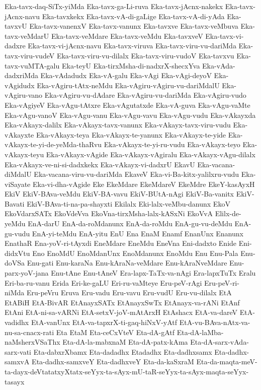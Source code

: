 {Eka-tavx-daq-SiTx-yiMda
Eka-tavx-ga-Li-ruva
Eka-tavx-jAcnx-nakekx
Eka-tavx-jAcnx-navu
Eka-tavxkekx
Eka-tavx-vA-di-gaLige
Eka-tavx-vA-di-yAda
Eka-tavxvU
Eka-tavx-vanenxV
Eka-tavx-vanunx
Eka-tavxve
Eka-tavx-veMbuva
Eka-tavx-veMdarU
Eka-tavx-veMdare
Eka-tavx-veMdu
Eka-tavxveV
Eka-tavx-vi-dadxre
Eka-tavx-vi-jAcnx-navu
Eka-tavx-viruva
Eka-tavx-viru-vu-dariMda
Eka-tavx-viru-vudeV
Eka-tavx-viru-vu-dilalx
Eka-tavx-viru-vudoV
Eka-tavxvu
Eka-tavx-vuMTA-galu
Eka-teyU
Eka-tirxMsha-di-nadxrX-shecxYva
Eka-vAda-dadxriMda
Eka-vAdadudx
Eka-vA-galu
Eka-vAgi
Eka-vAgi-deyoV
Eka-vAgidudx
Eka-vAgiru-tAtx-neMdu
Eka-vAgiru-vAgiru-vu-dariMdalU
Eka-vAgiru-vano
Eka-vAgiru-vu-dAdare
Eka-vAgiru-vu-dariMda
Eka-vAgiru-vudo
Eka-vAgiyeV
Eka-vAgu-tAtxre
Eka-vAgutatxde
Eka-vA-guva
Eka-vAgu-vaMte
Eka-vAgu-vanoV
Eka-vAgu-vanu
Eka-vAgu-vavu
Eka-vAgu-vudu
Eka-vAkayxda
Eka-vAkayx-dalilx
Eka-vAkayx-tavx-vanunx
Eka-vAkayx-tavx-viru-vudu
Eka-vAkayxte
Eka-vAkayx-teya
Eka-vAkayx-te-yanunx
Eka-vAkayx-te-yide
Eka-vAkayx-te-yi-de-yeMda-thaRvu
Eka-vAkayx-te-yi-ru-vudu
Eka-vAkayx-teyo
Eka-vAkayx-teyu
Eka-vAkayx-vAgide
Eka-vAkayx-vAgiralu
Eka-vAkayx-vAgu-dilalx
Eka-vAkayx-ve-ni-si-dadxkekx
Eka-vAkayx-vi-dadxrU
EkavU
Eka-vacana-diMdalU
Eka-vacana-viru-vu-dariMda
EkaveV
Eka-vi-Ba-kitx-yalilxru-vudu
Eka-viSayate
Eka-vi-dha-vAgide
Eke
EkeMdare
EkeMdareV
EkeMdre
EkeY-kasAyxH
EkiV
EkiV-BAva-veMdu
EkiV-BA-vavu
EkiV-BUtA-nAgi
EkiV-Ba-vanitx
EkiV-Bavati
EkiV-BAva-ti-na-pa-shayxti
Ekilalx
Eki-lalx-veMbu-danunx
EkoV
EkoVdarxSATx
EkoVdeVva
EkoVna-tirxMsha-lalx-kASxNi
EkoVvA
Elilx-de-yeMdu
EnA-darU
EnA-da-roMdanunx
EnA-da-roMdu
EnA-gu-vu-deMdu
EnA-gu-vudu
EnA-yi-teMdu
EnA-yitu
EnU
Ena
EnaM
Enamf
EnanUnx
Enanunx
EnathaR
Ena-yoV-ri-tAyxdi
EneMdare
EneMdu
EneVna
Eni-dadxto
Enide
Eni-didxVtu
Eno
EnoMdU
EnoMdanUnx
EnoMdanunx
EnoMdu
Enu
Enu-Pala
Enu-doVSa
Enu-gati
Enu-karaNa
Enu-kAraNa-veMdare
Enu-kAraNveMdare
Enu-parx-yoV-jana
Enu-tAne
Enu-tAneV
Era-lapx-TaTx-va-nAgi
Era-lapxTuTx
Eralu
Eri-ba-ru-vanu
Erida
Eri-ke-gaLU
Eri-ru-vaMteye
Eru-peV-rAgi
Eru-peV-ri-niMda
Eru-peVru
Eruva
Eru-vadu
Eru-vavu
Eru-vudU
Eru-vu-dilalx
EtA
EtABiH
EtA-BivAR
EtAnayxSATx
EtAnayxSwTx
EtAnayx-va-rANi
EtAnf
EtAni
EtA-ni-sa-vARNi
EtA-setxV-joV-mAtArxH
EtAshacx
EtA-va-dareV
EtA-vadidhx
EtA-vanUnx
EtA-va-tapxrX-ti-gaq-hiNxV-yAtf
EtA-vu-BAva-nAtx-va-nu-sa-cnacx-rati
Eta
EtaM
Eta-ceCxVteV
Eta-dA-gAtf
Eta-dA-laMba-naMsherxVSaThx
Eta-dA-la-mabxnaM
Eta-dA-patx-kAma
Eta-dA-sarx-vAda-sarx-vati
Eta-dabxrXbamx
Eta-dadadhx
Etadadhx
Eta-dadhxsamx
Eta-dadhx-samxvA
Eta-dadhx-samxveY
Eta-dadhxveY
Eta-da-kaSxraM
Eta-da-maqta-meV-ta-dayx-deVtatatxyXtatx-seYyx-ta-sAyx-mU-taR-seYyx-ta-sAyx-maqta-seYyx-tasayx
}
